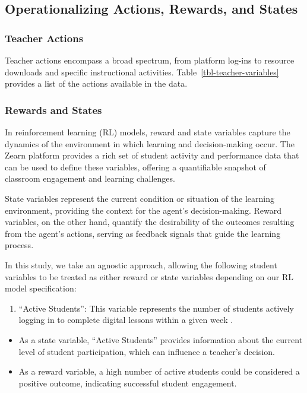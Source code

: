 \documentclass[
  number,
  preprint,
  3p,
  onecolumn]{elsarticle}
\providecommand{\tightlist}{%
  \setlength{\itemsep}{0pt}\setlength{\parskip}{0pt}}\usepackage{longtable,booktabs,array}
\begin{document}
\subsection{Operationalizing Actions, Rewards, and
States}\label{operationalizing-actions-rewards-and-states}

\subsubsection{Teacher Actions}\label{teacher-actions}

Teacher actions encompass a broad spectrum, from platform log-ins to
resource downloads and specific instructional activities.
Table~\ref{tbl-teacher-variables} provides a list of the actions
available in the data.

\subsubsection{Rewards and States}\label{rewards-and-states}

In reinforcement learning (RL) models, reward and state variables
capture the dynamics of the environment in which learning and
decision-making occur. The Zearn platform provides a rich set of student
activity and performance data that can be used to define these
variables, offering a quantifiable snapshot of classroom engagement and
learning challenges.

State variables represent the current condition or situation of the
learning environment, providing the context for the agent's
decision-making. Reward variables, on the other hand, quantify the
desirability of the outcomes resulting from the agent's actions, serving
as feedback signals that guide the learning process.

In this study, we take an agnostic approach, allowing the following
student variables to be treated as either reward or state variables
depending on our RL model specification:

\begin{enumerate}
\def\labelenumi{\arabic{enumi}.}
\tightlist
\item
  ``Active Students'': This variable represents the number of students
  actively logging in to complete digital lessons within a given week
  \citep{zearn2022}.
\end{enumerate}

\begin{itemize}
\tightlist
\item
  As a state variable, ``Active Students'' provides information about
  the current level of student participation, which can influence a
  teacher's decision.
\item
  As a reward variable, a high number of active students could be
  considered a positive outcome, indicating successful student
  engagement.
\end{itemize}
\end{document}
